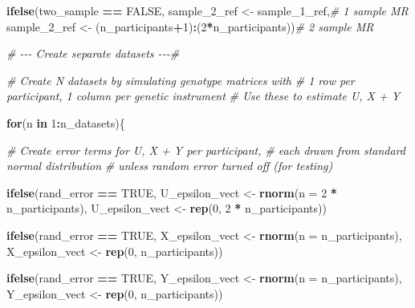 \documentclass[
]{article}
\newenvironment{Shaded}{\begin{snugshade}}{\end{snugshade}}
\newcommand{\AttributeTok}[1]{\textcolor[rgb]{0.13,0.29,0.53}{#1}}
\newcommand{\CommentTok}[1]{\textcolor[rgb]{0.56,0.35,0.01}{\textit{#1}}}
\newcommand{\ConstantTok}[1]{\textcolor[rgb]{0.56,0.35,0.01}{#1}}
\newcommand{\ControlFlowTok}[1]{\textcolor[rgb]{0.13,0.29,0.53}{\textbf{#1}}}
\newcommand{\DecValTok}[1]{\textcolor[rgb]{0.00,0.00,0.81}{#1}}
\newcommand{\FunctionTok}[1]{\textcolor[rgb]{0.13,0.29,0.53}{\textbf{#1}}}
\newcommand{\NormalTok}[1]{#1}
\newcommand{\OtherTok}[1]{\textcolor[rgb]{0.56,0.35,0.01}{#1}}
\newcommand{\SpecialCharTok}[1]{\textcolor[rgb]{0.81,0.36,0.00}{\textbf{#1}}}
\begin{document}
\begin{Shaded}
\begin{Highlighting}[]
   \FunctionTok{ifelse}\NormalTok{(two\_sample }\SpecialCharTok{==} \ConstantTok{FALSE}\NormalTok{,}
\NormalTok{          sample\_2\_ref }\OtherTok{\textless{}{-}}\NormalTok{ sample\_1\_ref,}\CommentTok{\# 1 sample MR}
\NormalTok{          sample\_2\_ref }\OtherTok{\textless{}{-}}\NormalTok{ (n\_participants}\SpecialCharTok{+}\DecValTok{1}\NormalTok{)}\SpecialCharTok{:}\NormalTok{(}\DecValTok{2}\SpecialCharTok{*}\NormalTok{n\_participants))}\CommentTok{\# 2 sample MR}

  \CommentTok{\# {-}{-}{-} Create separate datasets {-}{-}{-}\#}

  \CommentTok{\# Create N datasets by simulating genotype matrices with}
  \CommentTok{\# 1 row per participant, 1 column per genetic instrument}
  \CommentTok{\# Use these to estimate U, X + Y}

   \ControlFlowTok{for}\NormalTok{(n }\ControlFlowTok{in} \DecValTok{1}\SpecialCharTok{:}\NormalTok{n\_datasets)\{}

    \CommentTok{\# Create error terms for U, X + Y per participant,}
    \CommentTok{\# each drawn from standard normal distribution}
    \CommentTok{\# unless random error turned off (for testing)}

     \FunctionTok{ifelse}\NormalTok{(rand\_error }\SpecialCharTok{==} \ConstantTok{TRUE}\NormalTok{,}
\NormalTok{            U\_epsilon\_vect }\OtherTok{\textless{}{-}} \FunctionTok{rnorm}\NormalTok{(}\AttributeTok{n =} \DecValTok{2} \SpecialCharTok{*}\NormalTok{ n\_participants),}
\NormalTok{            U\_epsilon\_vect }\OtherTok{\textless{}{-}} \FunctionTok{rep}\NormalTok{(}\DecValTok{0}\NormalTok{, }\DecValTok{2} \SpecialCharTok{*}\NormalTok{ n\_participants))}

     \FunctionTok{ifelse}\NormalTok{(rand\_error }\SpecialCharTok{==} \ConstantTok{TRUE}\NormalTok{,}
\NormalTok{            X\_epsilon\_vect }\OtherTok{\textless{}{-}} \FunctionTok{rnorm}\NormalTok{(}\AttributeTok{n =}\NormalTok{ n\_participants),}
\NormalTok{            X\_epsilon\_vect }\OtherTok{\textless{}{-}} \FunctionTok{rep}\NormalTok{(}\DecValTok{0}\NormalTok{, n\_participants))}

     \FunctionTok{ifelse}\NormalTok{(rand\_error }\SpecialCharTok{==} \ConstantTok{TRUE}\NormalTok{,}
\NormalTok{            Y\_epsilon\_vect }\OtherTok{\textless{}{-}} \FunctionTok{rnorm}\NormalTok{(}\AttributeTok{n =}\NormalTok{ n\_participants),}
\NormalTok{            Y\_epsilon\_vect }\OtherTok{\textless{}{-}} \FunctionTok{rep}\NormalTok{(}\DecValTok{0}\NormalTok{, n\_participants))}


\end{Highlighting}
\end{Shaded}
\end{document}
